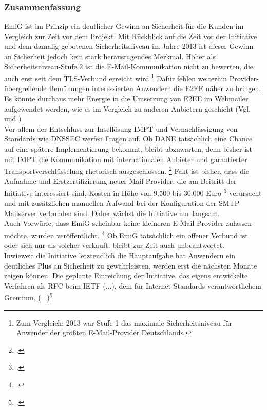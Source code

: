 \documentclass  [paper=a4,
				fontsize=12pt,
				listof=totoc,
				bibliography=totoc
				]{scrreprt}
\begin{document}
		\subsubsection{Zusammenfassung}
			\ac{EmiG} ist im Prinzip ein deutlicher Gewinn an Sicherheit für die Kunden im Vergleich zur Zeit vor dem Projekt. 
			Mit Rückblick auf die Zeit vor der Initiative und dem damalig gebotenen Sicherheitsniveau im Jahre 2013 ist dieser Gewinn an Sicherheit jedoch kein stark herausragendes Merkmal.
			Höher als Sicherheitsniveau-Stufe 2 ist die E-Mail-Kommunikation nicht zu bewerten, die auch erst seit dem \ac{TLS}-Verbund erreicht wird.\footnote{Zum Vergleich: 2013 war Stufe 1 das maximale Sicherheitsniveau für Anwender der größten E-Mail-Provider Deutschlands.}
			Dafür fehlen weiterhin Provider-übergreifende Bemühungen interessierten Anwendern die \ac{E2EE} näher zu bringen.
			Es könnte durchaus mehr Energie in die Umsetzung von \ac{E2EE} im Webmailer aufgewendet werden, wie es im Vergleich zu anderen Anbietern geschieht (Vgl.  und ) \medskip\\
			Vor allem der Entschluss zur Insellösung \ac{IMPT} und Vernachlässigung von Standards wie \ac{DNSSEC} werfen Fragen auf. 
			Ob \ac{DANE} tatsächlich eine Chance auf eine spätere Implementierung bekommt, bleibt abzuwarten, denn bisher ist mit \ac{IMPT} die Kommunikation mit internationalen Anbieter und garantierter Transportverschlüsselung rhetorisch ausgeschlossen.
			\footcite[Vgl.][]{Zivadino14-1}
			Fakt ist bisher, dass die Aufnahme und Erstzertifizierung neuer Mail-Provider, die am Beitritt der Initiative interessiert sind, Kosten in Höhe von 9.500 bis 30.000 Euro
			\footcite[Vgl.][]{Zivadino14-3} 
			verursacht und mit zusätzlichen manuellen Aufwand bei der Konfiguration der \ac{SMTP}-Mailserver verbunden sind.
			Daher wächst die Initiative nur langsam.\\
			Auch Vorwürfe, dass \ac{EmiG} scheinbar keine kleineren E-Mail-Provider zulassen möchte, wurden veröffentlicht.
			\footcite[Vgl.][]{Zivadino14-4}
			Ob \ac{EmiG} tatsächlich ein offener Verbund ist oder sich nur als solcher verkauft, bleibt zur Zeit auch unbeantwortet. \medskip\\
			Inwieweit die Initiative letztendlich die Hauptaufgabe hat Anwendern ein deutliches Plus an Sicherheit zu gewährleisten, werden erst die nächsten Monate zeigen können.
			Die geplante Einreichung der Initiative, das eigens entwickelte Verfahren als \ac{RFC} beim \ac{IETF} \glqq (...), dem für Internet-Standards verantwortlichem Gremium, (...)\grqq\footcite[][]{Zivadino14-2}
\end{document}

